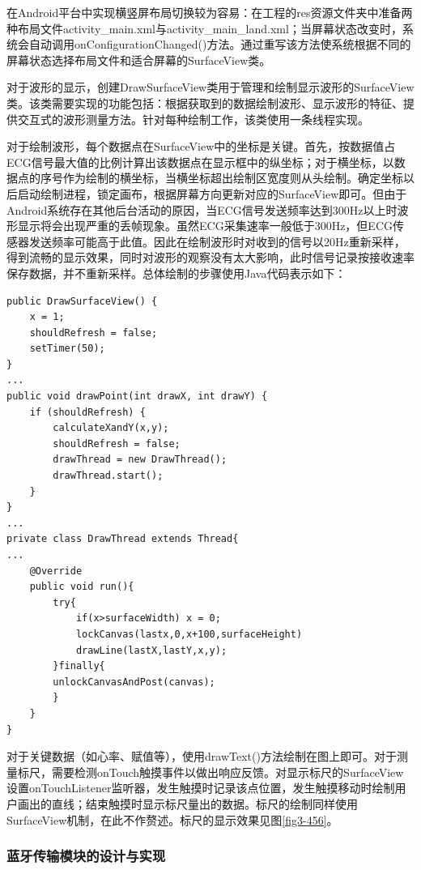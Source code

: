 在Android平台中实现横竖屏布局切换较为容易：在工程的res资源文件夹中准备两种布局文件activity\_main.xml与activity\_main\_land.xml；当屏幕状态改变时，系统会自动调用onConfigurationChanged()方法。通过重写该方法使系统根据不同的屏幕状态选择布局文件和适合屏幕的SurfaceView类。

对于波形的显示，创建DrawSurfaceView类用于管理和绘制显示波形的SurfaceView类。该类需要实现的功能包括：根据获取到的数据绘制波形、显示波形的特征、提供交互式的波形测量方法。针对每种绘制工作，该类使用一条线程实现。

对于绘制波形，每个数据点在SurfaceView中的坐标是关键。首先，按数据值占ECG信号最大值的比例计算出该数据点在显示框中的纵坐标；对于横坐标，以数据点的序号作为绘制的横坐标，当横坐标超出绘制区宽度则从头绘制。确定坐标以后启动绘制进程，锁定画布，根据屏幕方向更新对应的SurfaceView即可。但由于Android系统存在其他后台活动的原因，当ECG信号发送频率达到300Hz以上时波形显示将会出现严重的丢帧现象。虽然ECG采集速率一般低于300Hz，但ECG传感器发送频率可能高于此值。因此在绘制波形时对收到的信号以20Hz重新采样，得到流畅的显示效果，同时对波形的观察没有太大影响，此时信号记录按接收速率保存数据，并不重新采样。总体绘制的步骤使用Java代码表示如下：

\begin{center}
\begin{lstlisting}
public DrawSurfaceView() { 
    x = 1; 
    shouldRefresh = false;
    setTimer(50);
} 
...
public void drawPoint(int drawX, int drawY) { 
    if (shouldRefresh) { 
        calculateXandY(x,y);
        shouldRefresh = false; 
        drawThread = new DrawThread(); 
        drawThread.start(); 
    } 
} 
...
private class DrawThread extends Thread{
...
    @Override       
    public void run(){
        try{
            if(x>surfaceWidth) x = 0;
            lockCanvas(lastx,0,x+100,surfaceHeight)
            drawLine(lastX,lastY,x,y);
        }finally{
        unlockCanvasAndPost(canvas);            
        }
    }
}
\end{lstlisting}
\end{center}

对于关键数据（如心率、赋值等），使用drawText()方法绘制在图上即可。对于测量标尺，需要检测onTouch触摸事件以做出响应反馈。对显示标尺的SurfaceView设置onTouchListener监听器，发生触摸时记录该点位置，发生触摸移动时绘制用户画出的直线；结束触摸时显示标尺量出的数据。标尺的绘制同样使用SurfaceView机制，在此不作赘述。标尺的显示效果见图\ref{fig3-456}。

\subsubsection{蓝牙传输模块的设计与实现}

